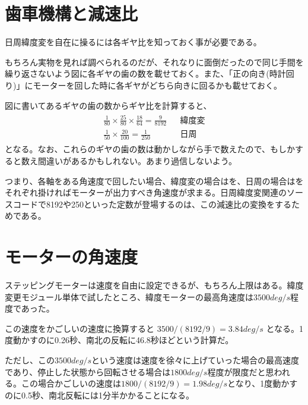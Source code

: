 \documentclass[letterpaper,10pt,dvipdfmx]{sphinxmanual}
\begin{document}
\section{歯車機構と減速比}
\label{\detokenize{nissyu-idohen/kikou:}}\label{\detokenize{nissyu-idohen/kikou:id4}}
日周緯度変を自在に操るには各ギヤ比を知っておく事が必要である。

もちろん実物を見れば調べられるのだが、それなりに面倒だったので同じ手間を繰り返さないよう図に各ギヤの歯の数を載せておく。また、「正の向き(時計回り)」にモーターを回した時に各ギヤがどちら向きに回るかも載せておく。


図に書いてあるギヤの歯の数からギヤ比を計算すると、
\begin{equation*}
\begin{split}\begin{aligned}
\frac{1}{80}\times\frac{25}{80}\times\frac{18}{64}=\frac{9}{8192}
&&\text{緯度変} \\
\frac{1}{50}\times\frac{20}{100}=\frac{1}{250}
&&\text{日周}\end{aligned}
\end{split}
\end{equation*}
となる。なお、これらのギヤの歯の数は動かしながら手で数えたので、もしかすると数え間違いがあるかもしれない。あまり過信しないよう。

つまり、各軸をある角速度で回したい場合、緯度変の場合はを、日周の場合はをそれぞれ掛ければモーターが出力すべき角速度が求まる。日周緯度変関連のソースコードで8192や250といった定数が登場するのは、この減速比の変換をするためである。


\section{モーターの角速度}
\label{\detokenize{nissyu-idohen/kikou:}}\label{\detokenize{nissyu-idohen/kikou:id5}}
ステッピングモーターは速度を自由に設定できるが、もちろん上限はある。緯度変更モジュール単体で試したところ、緯度モーターの最高角速度は\(3500 deg/s\)程度であった。

この速度をかごしいの速度に換算すると \(3500/(8192/9)=3.84 deg/s\) となる。1度動かすのに0.26秒、南北の反転に46.8秒ほどという計算だ。

ただし、この\(3500 deg/s\)という速度は速度を徐々に上げていった場合の最高速度であり、停止した状態から回転させる場合は\(1800 deg/s\)程度が限度だと思われる。この場合かごしいの速度は\(1800/(8192/9)=1.98 deg/s\)となり、1度動かすのに0.5秒、南北反転には1分半かかることになる。
\end{document}

